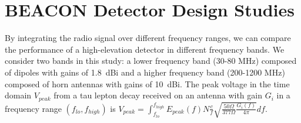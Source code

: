 \documentclass{PoS}
\begin{document}
\section{BEACON Detector Design Studies}\label{sec:receiver} 



By integrating the radio signal over different frequency ranges, we can compare the performance of a high-elevation detector in different frequency bands. We consider two bands in this study: a lower frequency band (30-80 MHz) composed of dipoles with gains of 1.8~dBi and a higher frequency band (200-1200 MHz) composed of horn antennas with gains of 10~dBi. The peak voltage in the time domain $V_{peak}$ from a tau lepton decay received on an antenna with gain $G_i$ in a frequency range $(f_{lo}, f_{high})$ is $V_{peak}=\int_{f_{lo}}^{f_{high}} E_{peak}(f)  N\frac{c}{f} \sqrt{\frac{50 \Omega }{377 \Omega} \frac{G_i(f)}{4 \pi} } df $.
\end{document}
